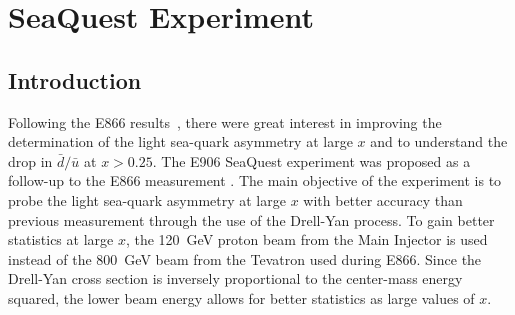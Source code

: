 \documentclass[../main.tex]{subfiles}
\begin{document}
\ifSubfilesClassLoaded{
	\mainmatter
	\setcounter{chapter}{3}
}{}

\chapter{SeaQuest Experiment}
\label{ch:seaquest}

\section{Introduction}
Following the E866 results~\cite{towell2001}, there were great interest in improving
the determination of the light sea-quark asymmetry at large $x$ and to understand
the drop in $\bar{d}/\bar{u}$ at $x>0.25$.
The E906 SeaQuest experiment was proposed as a follow-up to the E866 measurement \cite{isenhower2001}.
The main objective of the experiment is to probe the light sea-quark asymmetry at
large $x$ with better accuracy than previous measurement through the use of the Drell-Yan
process. To gain better statistics at large $x$, the \SI{120}{\GeV} proton beam from the Main
Injector is used instead of the \SI{800}{\GeV} beam from the Tevatron used during E866.
Since the Drell-Yan cross section is inversely proportional to the center-mass energy
squared, the lower beam energy allows for better statistics as large values of $x$.
\end{document}
